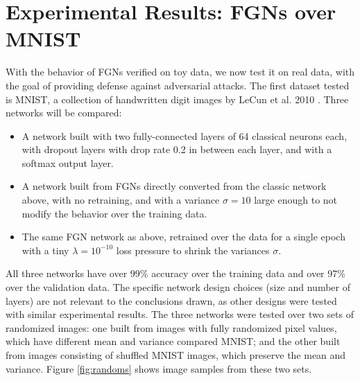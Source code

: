 \documentclass[12pt,oneside]{CUNY_PhD}
\begin{document}
\chapter{Experimental Results: FGNs over MNIST}
\label{Experimental Results: FGNs over MNIST}
With the behavior of FGNs verified on toy data, we now test it on real data, with the goal of providing defense against adversarial attacks. The first dataset tested is MNIST, a collection of handwritten digit images by LeCun et al. 2010 \cite{lecun-mnisthandwrittendigit-2010}. Three networks will be compared:
\begin{itemize}
    \item A network built with two fully-connected layers of 64 classical neurons each, with dropout layers with drop rate 0.2 in between each layer, and with a softmax output layer.
    \item A network built from FGNs directly converted from the classic network above, with no retraining, and with a variance $\sigma=10$ large enough to not modify the behavior over the training data.
    \item The same FGN network as above, retrained over the data for a single epoch with a tiny $\lambda=10^{-10}$ loss pressure to shrink the variances $\sigma$.
\end{itemize}
All three networks have over 99\% accuracy over the training data and over 97\% over the validation data. The specific network design choices (size and number of layers) are not relevant to the conclusions drawn, as other designs were tested with similar experimental results. The three networks were tested over two sets of randomized images: one built from images with fully randomized pixel values, which have different mean and variance compared MNIST; and the other built from images consisting of shuffled MNIST images, which preserve the mean and variance. Figure \ref{fig:randoms} shows image samples from these two sets.
\end{document}
